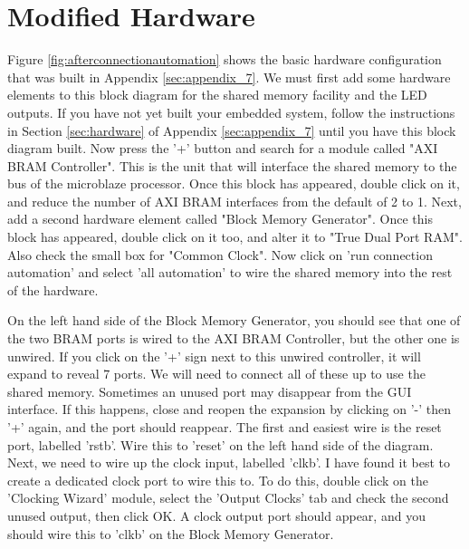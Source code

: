\documentclass[../physical_computing.tex]{subfiles}
\begin{document}
\section{Modified Hardware}
\label{sec:modified_hardware}

Figure \ref{fig:afterconnectionautomation} shows the basic hardware configuration that was built in 
Appendix \ref{sec:appendix_7}. We must first add some hardware elements to this block diagram for 
the shared memory facility and the LED outputs. If you have not yet built your embedded system, follow
the instructions in Section \ref{sec:hardware} of Appendix \ref{sec:appendix_7} until you have this 
block diagram built. Now press the '+' button and search for a module called "AXI BRAM Controller".
This is the unit that will interface the shared memory to the bus of the microblaze processor. Once
this block has appeared, double click on it, and reduce the number of AXI BRAM interfaces from the 
default of 2 to 1. Next, add a second hardware element called "Block Memory Generator". Once this block
has appeared, double click on it too, and alter it to "True Dual Port RAM". Also check the small box 
for "Common Clock". Now click on 'run connection automation' and select 'all automation' to wire the
shared memory into the rest of the hardware.

On the left hand side of the Block Memory Generator, you should see that one of the two BRAM ports is
wired to the AXI BRAM Controller, but the other one is unwired. If you click on the '+' sign next to
this unwired controller, it will expand to reveal 7 ports. We will need to connect all of these up to
use the shared memory. Sometimes an unused port may disappear from the GUI interface. If this happens,
close and reopen the expansion by clicking on '-' then '+' again, and the port should reappear. The 
first and easiest wire is the reset port, labelled 'rstb'. Wire this to 'reset' on the left hand side of the diagram.
Next, we need to wire up the clock input, labelled 'clkb'. I have found it best to create a dedicated clock 
port to wire this to. To do this, double click on the 'Clocking Wizard' module, select the 'Output Clocks' tab
and check the second unused output, then click OK. A clock output port should appear, and you should wire this to 
'clkb' on the Block Memory Generator. 
\end{document}
